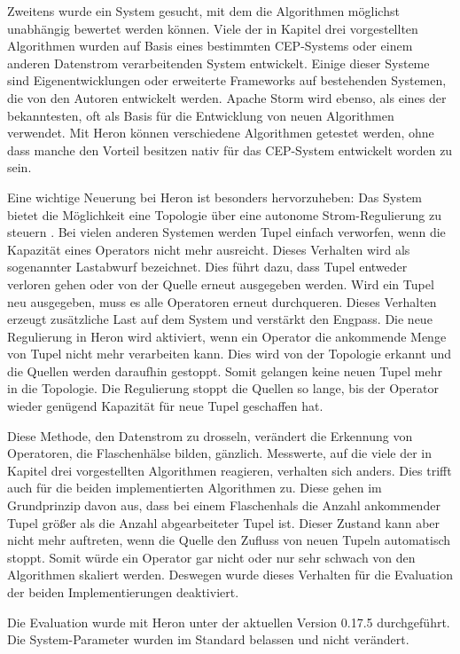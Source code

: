 Zweitens wurde ein System gesucht, mit dem die Algorithmen möglichst unabhängig bewertet werden können.
Viele der in Kapitel drei vorgestellten Algorithmen wurden auf Basis eines bestimmten CEP-Systems oder einem anderen Datenstrom verarbeitenden System entwickelt.
Einige dieser Systeme sind Eigenentwicklungen oder erweiterte Frameworks auf bestehenden Systemen, die von den Autoren entwickelt werden.
Apache Storm wird ebenso, als eines der bekanntesten, oft als Basis für die Entwicklung von neuen Algorithmen verwendet.
Mit Heron können verschiedene Algorithmen getestet werden, ohne dass manche den Vorteil besitzen nativ für das CEP-System entwickelt worden zu sein.

Eine wichtige Neuerung bei Heron ist besonders hervorzuheben:
Das System bietet die Möglichkeit eine Topologie über eine autonome Strom-Regulierung zu steuern \cite{kulkarni_twitter_2015}.
Bei vielen anderen Systemen werden Tupel einfach verworfen, wenn die Kapazität eines Operators nicht mehr ausreicht.
Dieses Verhalten wird als sogenannter Lastabwurf bezeichnet.
Dies führt dazu, dass Tupel entweder verloren gehen oder von der Quelle erneut ausgegeben werden.
Wird ein Tupel neu ausgegeben, muss es alle Operatoren erneut durchqueren.
Dieses Verhalten erzeugt zusätzliche Last auf dem System und verstärkt den Engpass.
Die neue Regulierung in Heron wird aktiviert, wenn ein Operator die ankommende Menge von Tupel nicht mehr verarbeiten kann.
Dies wird von der Topologie erkannt und die Quellen werden daraufhin gestoppt.
Somit gelangen keine neuen Tupel mehr in die Topologie.
Die Regulierung stoppt die Quellen so lange, bis der Operator wieder genügend Kapazität für neue Tupel geschaffen hat.

Diese Methode, den Datenstrom zu drosseln, verändert die Erkennung von Operatoren, die Flaschenhälse bilden, gänzlich.
Messwerte, auf die viele der in Kapitel drei vorgestellten Algorithmen reagieren, verhalten sich anders.
Dies trifft auch für die beiden implementierten Algorithmen zu.
Diese gehen im Grundprinzip davon aus, dass bei einem Flaschenhals die Anzahl ankommender Tupel größer als die Anzahl abgearbeiteter Tupel ist.
Dieser Zustand kann aber nicht mehr auftreten, wenn die Quelle den Zufluss von neuen Tupeln automatisch stoppt.
Somit würde ein Operator gar nicht oder nur sehr schwach von den Algorithmen skaliert werden.
Deswegen wurde dieses Verhalten für die Evaluation der beiden Implementierungen deaktiviert.

Die Evaluation wurde mit Heron unter der aktuellen Version 0.17.5 durchgeführt.
Die System-Parameter wurden im Standard belassen und nicht verändert.

